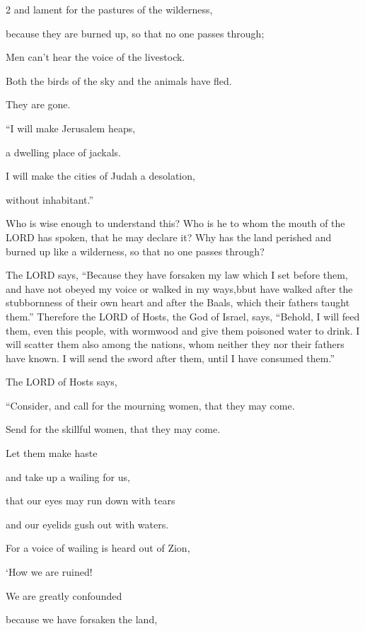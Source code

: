 \begin{multicols}{2}
	and lament for the pastures of the wilderness,
	
	because they are burned up, so that no one passes through;
	
	Men can’t hear the voice of the livestock.
	
	Both the birds of the sky and the animals have fled.
	
	They are gone.
	
	
	\vspace{\baselineskip}
	
	\myverse{}“I will make Jerusalem heaps,
	
	a dwelling place of jackals.
	
	I will make the cities of Judah a desolation,
	
	without inhabitant.”
	
	
	\myverse{}Who is wise enough to understand this? Who is he to whom the mouth of the LORD has spoken, that he may declare it? Why has the land perished and burned up like a wilderness, so that no one passes through?
	
	
	\myverse{}The LORD says, “Because they have forsaken my law which I set before them, and have not obeyed my voice or walked in my ways,b\myverse{}but have walked after the stubbornness of their own heart and after the Baals, which their fathers taught them.” \myverse{}Therefore the LORD of Hosts, the God of Israel, says, “Behold, I will feed them, even this people, with wormwood and give them poisoned water to drink. \myverse{}I will scatter them also among the nations, whom neither they nor their fathers have known. I will send the sword after them, until I have consumed them.”
	
	
	\myverse{}The LORD of Hosts says, 
	
	
	“Consider, and call for the mourning women, that they may come.  
	
	Send for the skillful women, that they may come.
	
	\myverse{}Let them make haste
	
	and take up a wailing for us,
	
	that our eyes may run down with tears
	
	and our eyelids gush out with waters.
	
	
	\myverse{}For a voice of wailing is heard out of Zion,
	
	‘How we are ruined!
	
	We are greatly confounded
	
	because we have forsaken the land,
	

\end{multicols}
